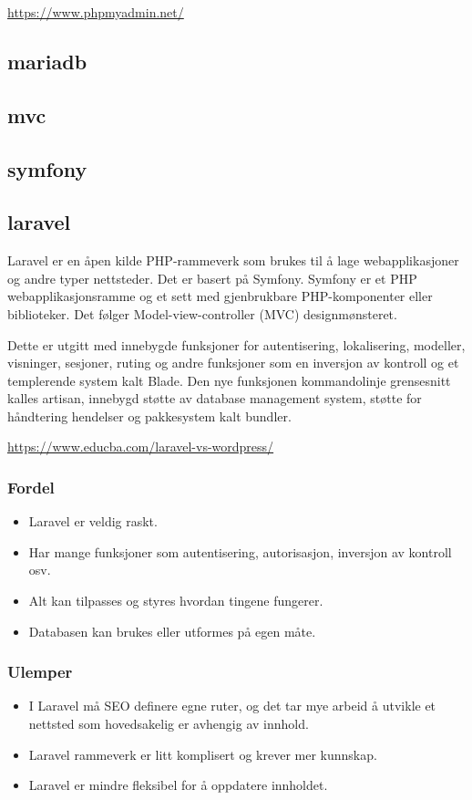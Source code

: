 \url{https://www.phpmyadmin.net/}

\subsection{mariadb}

\subsection{mvc}

\subsection{symfony}

\subsection{laravel}
Laravel er en åpen kilde PHP-rammeverk som brukes til å lage webapplikasjoner og andre typer nettsteder. Det er basert på Symfony. Symfony er et PHP webapplikasjonsramme og et sett med gjenbrukbare PHP-komponenter eller biblioteker. Det følger Model-view-controller (MVC) designmønsteret.

Dette er utgitt med innebygde funksjoner for autentisering, lokalisering, modeller, visninger, sesjoner, ruting og andre funksjoner som en inversjon av kontroll og et templerende system kalt Blade. Den nye funksjonen kommandolinje grensesnitt kalles artisan, innebygd støtte av database management system, støtte for håndtering hendelser og pakkesystem kalt bundler.

\url{https://www.educba.com/laravel-vs-wordpress/}

\subsubsection{Fordel}
\begin{itemize}
\item Laravel er veldig raskt.
\item Har mange funksjoner som autentisering, autorisasjon, inversjon av kontroll osv.
\item Alt kan tilpasses og styres hvordan tingene fungerer.
\item Databasen kan brukes eller utformes på egen måte.
\end{itemize}

\subsubsection{Ulemper}
\begin{itemize}
\item I Laravel må SEO definere egne ruter, og det tar mye arbeid å utvikle et nettsted som hovedsakelig er avhengig av innhold.
\item Laravel rammeverk er litt komplisert og krever mer kunnskap.
\item Laravel er mindre fleksibel for å oppdatere innholdet.
\end{itemize}

